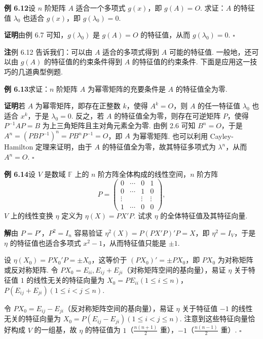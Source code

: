 \documentclass[UTF8, 12pt, fontset=fandol, oneside]{ctexart}
\begin{document}
\noindent\textbf{例 6.12}\quad 设 $n$ 阶矩阵 $A$ 适合一个多项式 $g(x)$，即 $g(A)=O$. 求证：$A$ 的特征值 $\lambda_0$ 也适合 $g(x)$，即 $g(\lambda_0)=0$.

\noindent\textbf{证明}\quad 由例 6.7 可知，$g(\lambda_0)$ 是 $g(A)=O$ 的特征值，从而 $g(\lambda_0)=0$. $\square$

\noindent\textbf{注}\quad 例 6.12 告诉我们：可以由 $A$ 适合的多项式得到 $A$ 可能的特征值. 一般地，还可以由 $g(A)$ 的特征值的约束条件得到 $A$ 的特征值的约束条件. 下面是应用这一技巧的几道典型例题.

\noindent\textbf{例 6.13}\quad 求证：$n$ 阶矩阵 $A$ 为幂零矩阵的充要条件是 $A$ 的特征值全为零.

\noindent\textbf{证明}\quad 若 $A$ 为幂零矩阵，即存在正整数 $k$，使得 $A^k=O$，则 $A$ 的任一特征值 $\lambda_0$ 也适合 $x^k$，于是 $\lambda_0=0$. 反之，若 $A$ 的特征值全为零，则存在可逆矩阵 $P$，使得 $P^{-1}AP=B$ 为上三角矩阵且主对角元素全为零. 由例 2.6 可知 $B^n=O$，于是 $A^n=(PBP^{-1})^n=PB^nP^{-1}=O$，即 $A$ 为幂零矩阵. 也可以利用 Cayley-Hamilton 定理来证明，由于 $A$ 的特征值全为零，故其特征多项式为 $\lambda^n$，从而 $A^n=O$. $\square$

\noindent\textbf{例 6.14}\quad 设 $V$ 是数域 $\mathbb{F}$ 上的 $n$ 阶方阵全体构成的线性空间，$n$ 阶方阵
\[
P=\left(\begin{array}{cccc}
0 & \cdots & 0 & 1\\
0 & \cdots & 1 & 0\\
\vdots & & \vdots & \vdots\\
1 & \cdots & 0 & 0
\end{array}\right),
\]
$V$ 上的线性变换 $\eta$ 定义为 $\eta(X)=PX'P$. 试求 $\eta$ 的全体特征值及其特征向量.

\noindent\textbf{解}\quad 由 $P=P'$，$P^2=I_n$ 容易验证 $\eta^2(X)=P(PX'P)'P=X$，即 $\eta^2=I_V$，于是 $\eta$ 的特征值也适合多项式 $x^2-1$，从而特征值只能是 $\pm 1$.

设 $\eta(X_0)=PX_0'P=\pm X_0$，这等价于 $(PX_0)'=\pm PX_0$，即 $PX_0$ 为对称矩阵或反对称矩阵. 令 $PX_0=E_{ii},E_{ij}+E_{ji}$（对称矩阵空间的基向量），易证 $\eta$ 关于特征值 $1$ 的线性无关的特征向量为 $X_0=PE_{ii}(1\le i\le n)$，$P(E_{ij}+E_{ji})(1\le i<j\le n)$.

令 $PX_0=E_{ij}-E_{ji}$（反对称矩阵空间的基向量），易证 $\eta$ 关于特征值 $-1$ 的线性无关的特征向量为 $X_0=P(E_{ij}-E_{ji})(1\le i<j\le n)$. 注意到这些特征向量恰好构成 $V$ 的一组基，故 $\eta$ 的特征值为 $1$（$\frac{n(n+1)}{2}$ 重），$-1$（$\frac{n(n-1)}{2}$ 重）. $\square$
\end{document}
